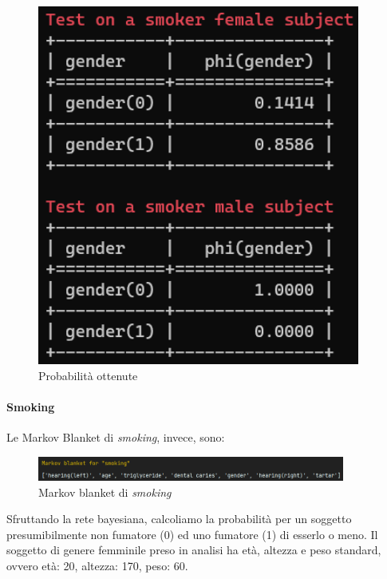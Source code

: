 \documentclass{article}
\begin{document}
\begin{figure}[H]
        \includegraphics[width=10.6cm]{smokeGen}
        \centering
        \caption{Probabilità ottenute}
        \centering
\end{figure}


\paragraph{Smoking}

Le Markov Blanket di \textit{smoking}, invece, sono:

\begin{figure}[H]
        \includegraphics[width=0.9\textwidth]{MARK}
        \centering
        \caption{Markov blanket di \textit{smoking}}
        \centering
\end{figure}

%
Sfruttando la rete bayesiana, calcoliamo la probabilità per un soggetto presumibilmente non fumatore (0) ed uno fumatore (1) di esserlo o meno. Il soggetto di genere femminile preso in analisi ha età, altezza e peso standard, ovvero età: 20, altezza: 170, peso: 60.
\end{document}
